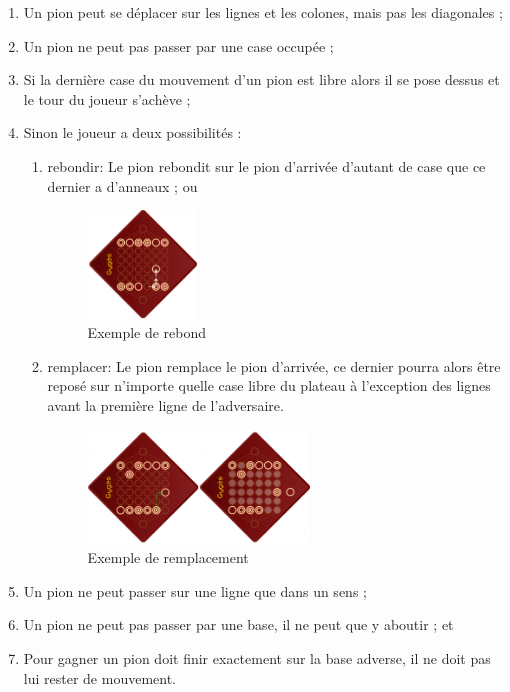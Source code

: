 \begin{enumerate}
			\item Un pion peut se déplacer sur les lignes et les colones, mais pas les diagonales ;
			\item Un pion ne peut pas passer par une case occupée ;
			\item Si la dernière case du mouvement d'un pion est libre alors il se pose dessus et le tour
			du joueur s'achève ;

			\item Sinon le joueur a deux possibilités :
				\begin{enumerate}
					\item rebondir: Le pion rebondit sur le pion d'arrivée d'autant de case que
						ce dernier a d'anneaux ; ou
						\begin{figure}[h!]
							\centering
							\includegraphics[width=0.29\textwidth]{images/rebond.png}
							\caption{Exemple de rebond}
							\label{fig:rebond}
						\end{figure}
					\item remplacer: Le pion remplace le pion d'arrivée, ce dernier pourra alors être
						reposé sur n'importe quelle case libre du plateau à l'exception des lignes avant
						la première ligne de l'adversaire.
						\begin{figure}[h!]
							\centering
							\includegraphics[width=0.59\textwidth]{images/remplacement.png}
							\caption{Exemple de remplacement}
							\label{fig:remplacement}
						\end{figure}
				\end{enumerate}
			\item Un pion ne peut passer sur une ligne que dans un sens ;
			\item Un pion ne peut pas passer par une base, il ne peut que y aboutir ; et
			\item Pour gagner un pion doit finir exactement sur la base adverse, il ne doit pas lui
				rester de mouvement.
		\end{enumerate}

